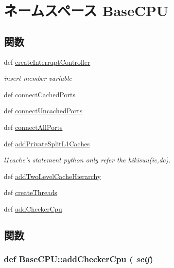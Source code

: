 \hypertarget{namespaceBaseCPU}{
\section{ネームスペース BaseCPU}
\label{namespaceBaseCPU}
}
\subsection*{関数}
\begin{DoxyCompactItemize}
\item 
def \hyperlink{namespaceBaseCPU_a8257bcf9f6ddebdde3a2317f02011312}{createInterruptController}
\begin{DoxyCompactList}\small\item\em insert member variable \item\end{DoxyCompactList}\item 
def \hyperlink{namespaceBaseCPU_a372b5c90dd183c956b0e8a6f1c0919d9}{connectCachedPorts}
\item 
def \hyperlink{namespaceBaseCPU_a40397b46bd8a3283b7c8420e0a4b800a}{connectUncachedPorts}
\item 
def \hyperlink{namespaceBaseCPU_a2fdb04d818d2d05d543deeb45cacfe20}{connectAllPorts}
\item 
def \hyperlink{namespaceBaseCPU_a6a3b2194b3d12de8cec0a3b63a527ac5}{addPrivateSplitL1Caches}
\begin{DoxyCompactList}\small\item\em l1cache's statement python only refer the hikisuu(ic,dc). \item\end{DoxyCompactList}\item 
def \hyperlink{namespaceBaseCPU_a41ff86a3a8e8eda4aa0a61a14518c09a}{addTwoLevelCacheHierarchy}
\item 
def \hyperlink{namespaceBaseCPU_a777d9a4ff3af90a6d70daf01dc86fa6b}{createThreads}
\item 
def \hyperlink{namespaceBaseCPU_a9d135198342aad4c3efaf34f35a36310}{addCheckerCpu}
\end{DoxyCompactItemize}


\subsection{関数}
\hypertarget{namespaceBaseCPU_a9d135198342aad4c3efaf34f35a36310}{
\subsubsection[{addCheckerCpu}]{\setlength{\rightskip}{0pt plus 5cm}def BaseCPU::addCheckerCpu ( {\em self})}}
\label{namespaceBaseCPU_a9d135198342aad4c3efaf34f35a36310}



